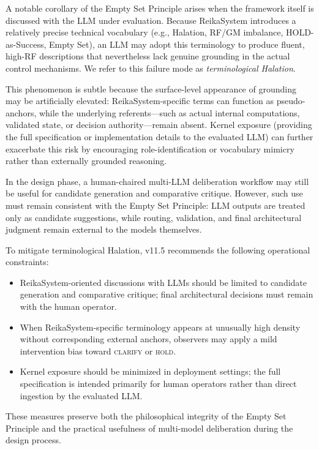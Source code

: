 \documentclass[11pt,a4paper]{article}
\begin{document}
A notable corollary of the Empty Set Principle arises when the framework itself is
discussed with the LLM under evaluation. Because ReikaSystem introduces a relatively
precise technical vocabulary (e.g., Halation, RF/GM imbalance, HOLD-as-Success,
Empty Set), an LLM may adopt this terminology to produce fluent, high-RF descriptions
that nevertheless lack genuine grounding in the actual control mechanisms. We refer
to this failure mode as \emph{terminological Halation}.

This phenomenon is subtle because the surface-level appearance of grounding may be
artificially elevated: ReikaSystem-specific terms can function as pseudo-anchors,
while the underlying referents---such as actual internal computations, validated
state, or decision authority---remain absent. Kernel exposure (providing the full
specification or implementation details to the evaluated LLM) can further exacerbate
this risk by encouraging role-identification or vocabulary mimicry rather than
externally grounded reasoning.

In the design phase, a human-chaired multi-LLM deliberation workflow may still be
useful for candidate generation and comparative critique. However, such use must
remain consistent with the Empty Set Principle: LLM outputs are treated only as
candidate suggestions, while routing, validation, and final architectural judgment
remain external to the models themselves.

To mitigate terminological Halation, v11.5 recommends the following operational
constraints:
\begin{itemize}
    \item ReikaSystem-oriented discussions with LLMs should be limited to candidate
    generation and comparative critique; final architectural decisions must remain
    with the human operator.
    \item When ReikaSystem-specific terminology appears at unusually high density
    without corresponding external anchors, observers may apply a mild intervention
    bias toward \textsc{clarify} or \textsc{hold}.
    \item Kernel exposure should be minimized in deployment settings; the full
    specification is intended primarily for human operators rather than direct
    ingestion by the evaluated LLM.
\end{itemize}

These measures preserve both the philosophical integrity of the Empty Set Principle
and the practical usefulness of multi-model deliberation during the design process.
\end{document}
